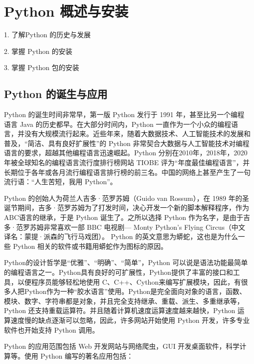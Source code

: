 \chapter{Python 概述与安装}

\setlength{\parskip}{1ex}

\begin{introduction}[学习目标]
	\item 1. 了解Python 的历史与发展
	\item 2. 掌握 Python 的安装
	\item 3. 掌握 Python 包的安装
\end{introduction}


\section{Python 的诞生与应用}
Python 的诞生时间非常早，第一版 Python 发行于 1991 年，甚至比另一个编程语言 Java 的历史都早。在大部分时间内，Python 一直作为一个小众的编程语言，并没有大规模流行起来。近些年来，随着大数据技术、人工智能技术的发展和普及，“简洁、具有良好扩展性”的 Python 非常契合大数据与人工智能技术对编程语言的要求，超越其他编程语言迅速崛起。Python 分别在2010年，2018年，2020年被全球知名的编程语言流行度排行榜网站 TIOBE 评为“年度最佳编程语言”，并长期位于各年或各月流行编程语言排行榜的前三名。中国的网络上甚至产生了一句流行语：“人生苦短，我用 Python”。

Python 的创始人为荷兰人吉多·范罗苏姆（Guido van Rossum），在 1989 年的圣诞节期间，吉多·范罗苏姆为了打发时间，决心开发一个新的脚本解释程序，作为 ABC语言的继承，于是 Python 诞生了。之所以选择 Python 作为名字，是由于吉多·范罗苏姆非常喜欢一部 BBC 电视剧--- Monty Python's Flying Circus（中文译名：蒙提·派森的飞行马戏团）。 Python 的英文意思为蟒蛇，这也是为什么一些 Python 相关的软件或书籍用蟒蛇作为图标的原因。

Python的设计哲学是“优雅”、“明确”、“简单”，Python 可以说是语法功能最简单的编程语言之一。Python具有良好的可扩展性，Python提供了丰富的接口和工具，以便程序员能够轻松地使用 C、C++、Cython来编写扩展模块，因此，有很多人把Python作为一种“胶水语言”使用。Python是完全面向对象的语言，函数、模块、数字、字符串都是对象，并且完全支持继承、重载、派生、多重继承等，Python 还支持重载运算符。并且随着计算机速度运算速度越来越快，Python 运算速度慢的缺点逐渐可以忽略，因此，许多网站开始使用 Python 开发，许多专业软件也开始支持 Python 调用。

Python 的应用范围包括 Web 开发网站与网络爬虫，GUI 开发桌面软件，科学计算等。使用 Python 编写的著名应用包括：

